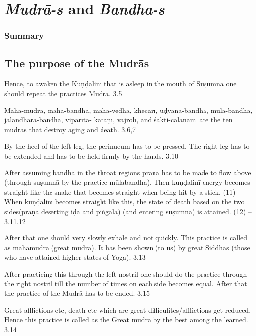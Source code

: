 \chapter{\textit{Mudrā-s} and \textit{Bandha-s}}

\subsection*{Summary}

\section*{The purpose of the Mudrās}

Hence, to awaken the Kuṇḍalinī that is asleep in the mouth of Suṣumnā one should repeat the practices Mudrā. 3.5


Mahā-mudrā,  mahā-bandha,  mahā-vedha,  khecarī, uḍyāna-bandha, mūla-bandha, jālandhara-bandha, viparīta- karaṇī, vajrolī, and  śakti-cālanam are the ten mudrās that destroy  aging and death. 3.6,7


By the heel of the left leg, the perinueum has to be pressed. The right leg has to be extended and has to be held firmly by the hands.   3.10

After assuming bandha in the throat regions prāṇa has to be made to flow above (through suṣumnā by the practice  mūlabandha). Then kuṇḍalinī energy becomes straight like the snake that becomes straight when being hit by a stick. (11) When kuṇḍalinī becomes straight like this, the state of death based on the two sides(prāṇa deserting iḍā and piṅgalā) (and entering suṣumnā) is attained. (12) – 3.11,12

After that one should very slowly exhale and not quickly. This practice is called as mahāmudrā (great mudrā). It has been shown (to us) by great Siddhas (those who have attained higher states of Yoga).  3.13

After practicing this through the left nostril one should do the practice through the right nostril till the number of times on each side becomes equal. After that the practice of the Mudrā has to be ended. 3.15


Great afflictions etc, death etc which are great difficulites/afflictions get reduced. Hence this practice is called as the Great mudrā by the best among the learned. 3.14

